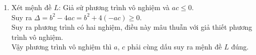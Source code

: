 \begin{ex}
{\begin{enumerate}
Vì $ abc=1 $ nên $ c<1 $ do đó
$(a-1)(b-1)(c-1)<0 \Leftrightarrow abc+a+b+c-ab-bc-ca-1<0\\
\Leftrightarrow a+b+c<ab+bc+ca\Leftrightarrow a+b+c<\dfrac{1}{a}+\dfrac{1}{b}+\dfrac{1}{c} \text{(mâu thuẫn)}$.\\
Thừ với $ a=b=c=1 $ ta có $ a+b+c=\dfrac{1}{a}+\dfrac{1}{b}+\dfrac{1}{c}=3 $ (không thỏa đề bài).\\
Vậy chỉ có một và chỉ một trong ba số $ a $, $ b $, $ c $  lớn hơn $ 1 $ suy ra mệnh đề $K$ đúng.
\item Xét mệnh đề $ L$: Giả sử phương trình vô nghiệm và $ a c\leq 0 $.\\
Suy ra $ \Delta =b^2-4ac=b^2+4(-ac)\geq 0 $.\\
Suy ra phương trình có hai nghiệm, điều này mâu thuẫn với giả thiết phương trình vô nghiệm.\\
Vậy phương trình vô nghiệm thì $ a $, $ c $  phải cùng dấu suy ra mệnh đề $L$ đúng.
\end{enumerate}
}
\end{ex}


